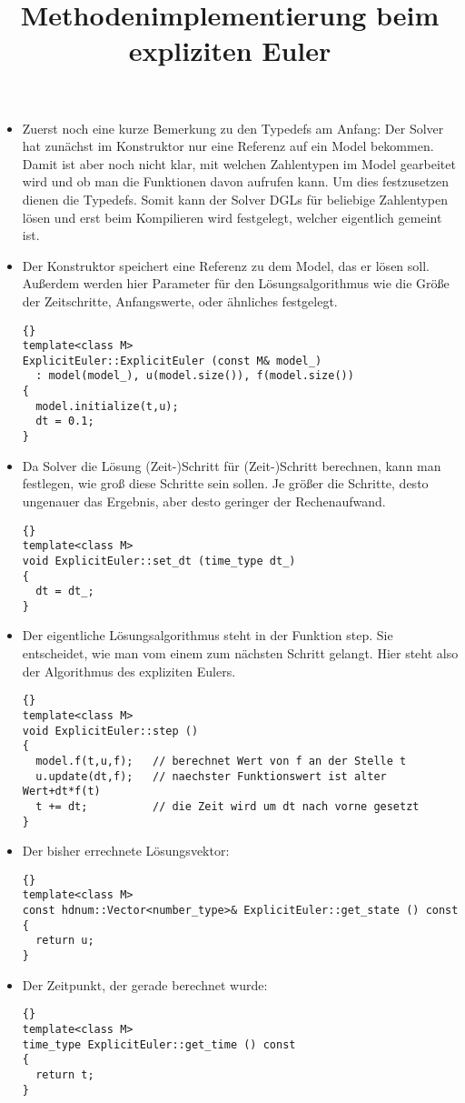 \documentclass[a4paper,11pt]{article}
\theoremstyle{definition}
\begin{document}
\title{\textbf{Methodenimplementierung beim expliziten Euler}}
\begin{itemize}

\item Zuerst noch eine kurze Bemerkung zu den Typedefs am Anfang: Der Solver hat zunächst im Konstruktor nur eine Referenz auf ein Model bekommen. Damit ist aber noch nicht klar, mit welchen Zahlentypen im Model gearbeitet wird und ob man die Funktionen davon aufrufen kann. Um dies festzusetzen dienen die Typedefs. Somit kann der Solver DGLs für beliebige Zahlentypen lösen und erst beim Kompilieren wird festgelegt, welcher eigentlich gemeint ist.

\item Der Konstruktor speichert eine Referenz zu dem Model, das er lösen soll. Außerdem werden hier Parameter für den Lösungsalgorithmus wie die Größe der Zeitschritte, Anfangswerte, oder ähnliches festgelegt.
{\footnotesize{\begin{lstlisting}{}
template<class M>
ExplicitEuler::ExplicitEuler (const M& model_)
  : model(model_), u(model.size()), f(model.size())
{
  model.initialize(t,u);
  dt = 0.1; 
}
\end{lstlisting}}}
\item Da Solver die Lösung (Zeit-)Schritt für (Zeit-)Schritt berechnen, kann man festlegen, wie groß diese Schritte sein sollen. Je größer die Schritte, desto ungenauer das Ergebnis, aber desto geringer der Rechenaufwand.
{\footnotesize{\begin{lstlisting}{}
template<class M>
void ExplicitEuler::set_dt (time_type dt_)
{
  dt = dt_;
}
\end{lstlisting}}}
\item Der eigentliche Lösungsalgorithmus steht in der Funktion step. Sie entscheidet, wie man vom einem zum nächsten Schritt gelangt. Hier steht also der Algorithmus des expliziten Eulers.
{\footnotesize{\begin{lstlisting}{}
template<class M>
void ExplicitEuler::step ()
{
  model.f(t,u,f);   // berechnet Wert von f an der Stelle t
  u.update(dt,f);   // naechster Funktionswert ist alter Wert+dt*f(t)
  t += dt;          // die Zeit wird um dt nach vorne gesetzt
}
\end{lstlisting}}}

\item Der bisher errechnete Lösungsvektor:
{\footnotesize{\begin{lstlisting}{}
template<class M>
const hdnum::Vector<number_type>& ExplicitEuler::get_state () const
{
  return u;
}
\end{lstlisting}}}
\item Der Zeitpunkt, der gerade berechnet wurde:
{\footnotesize{\begin{lstlisting}{}
template<class M>
time_type ExplicitEuler::get_time () const
{
  return t;
}
\end{lstlisting}}}


\end{itemize}
\end{document}
